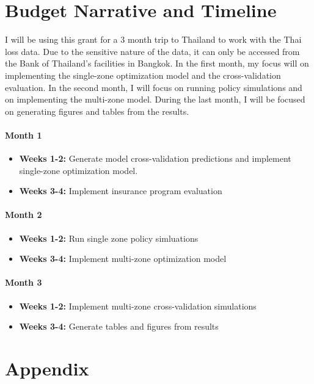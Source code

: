 \documentclass[12pt]{article}
\begin{document}
\section{Budget Narrative and Timeline}
I will be using this grant for a 3 month trip to Thailand to work with the Thai loss data. Due to the sensitive nature of the data, it can only be accessed from the Bank of Thailand's facilities in Bangkok. In the first month, my focus will on implementing the single-zone optimization model and the cross-validation evaluation. In the second month, I will focus on running policy simulations and on implementing the multi-zone model. During the last month, I will be focused on generating figures and tables from the results. 

\paragraph{Month 1}
\begin{itemize}
  \item \textbf{Weeks 1-2:} Generate model cross-validation predictions and implement single-zone optimization model. 
  \item \textbf{Weeks 3-4:} Implement insurance program evaluation
\end{itemize}

\paragraph*{Month 2}
\begin{itemize}
  \item \textbf{Weeks 1-2:} Run single zone policy simluations
  \item \textbf{Weeks 3-4:} Implement multi-zone optimization model
\end{itemize}

\paragraph*{Month 3}
\begin{itemize}
  \item \textbf{Weeks 1-2:} Implement multi-zone cross-validation simulations
  \item \textbf{Weeks 3-4:} Generate tables and figures from results
\end{itemize}

\newpage
\printbibliography

\section{Appendix}
\end{document}
